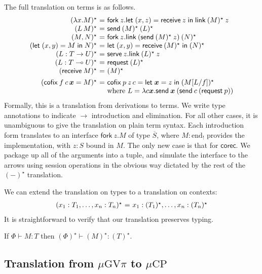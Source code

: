\documentclass[orivec,envcountsame]{llncs}
\makeatletter
\newcommand{\gvdual}[1]{\overline{#1}}
\newcommand{\lto}{\ensuremath{\multimap}}
\newcommand{\uto}{\ensuremath{\rightarrow}}
\newcommand{\outterm}{\mathrm{end}_!}
\newcommand{\gvtyp}[3]{#1 \vdash #2 : #3}
\newcommand{\mkwd}[1]{\mathsf{#1}}
\newcommand{\gvsend}[2]{\mkwd{send}\:#1\:#2}
\newcommand{\gvreceive}[1]{\mkwd{receive}\:#1}
\newcommand{\gvlet}[3]{\mkwd{let}\;#1 = #2\;\mkwd{in}\;#3}
\newcommand{\gvlink}[2]{\mkwd{link}\:#1\:#2}
\newcommand{\gvfork}[2]{\mkwd{fork}\:#1.#2}
\newcommand{\lrkwd}{\mkwd{cofix}}
\newcommand{\gvfix}[3]{\lrkwd\:#1\:#2 = #3}
\newcommand{\gvserve}[2]{\mkwd{serve}\:#1.#2}
\newcommand{\gvrequest}[1]{\mkwd{request}\:#1}
\newcommand{\key}{\mkwd}
\newcommand{\topi}[1]{({#1})^\star}
\newcommand{\mucp}{$\mu\mathrm{CP}$\xspace}
\newcommand{\gvpi}{$\mu\mathrm{GV}\pi$\xspace}
\newcommand{\ba}{\begin{array}}
\newcommand{\ea}{\end{array}}
\newenvironment{equations}{\[\ba{@{}r@{~}c@{~}l@{}}}{\ea\]}
\makeatother
\begin{document}
The full translation on terms is as follows.
\begin{equations}
\topi{\lambda x.M} &=& \gvfork{z}{\gvlet{(x, z)}{\gvreceive{z}}{\gvlink{\topi{M}}{z}}} \\
\topi{L\,M} &=& \gvsend{\topi{M}}{\topi{L}} \\
\topi{M, N} &=&
  \gvfork{z}
    {\gvlink{(\gvsend{\topi{M}}{z})}{\topi{N}}} \\
\topi{\gvlet{(x, y)}{M}{N}} &=&
    \gvlet{(x, y)}{\gvreceive{\topi{M}}}{\topi{N}} \\
\topi{L : T \uto U} &=&
  \gvserve{z}{\gvlink{\topi{L}}{z}} \\
\topi{L : T \lto U} &=& \gvrequest{\topi{L}} \\
\topi{\gvreceive{M}} &=& \topi{M}
\\[1ex]
\topi{\gvfix{f}{c\,\vec{x}}{M}} &=&
  \gvfix{p}{z\,c}{\gvlet{\vec{x}}{z}{\topi{M[L/f]}}} \\
&& \text{where }L = \lambda c \vec{x}.\gvsend{\vec{x}}{(\gvsend{c}{(\gvrequest{p})})} \\
\end{equations}%
Formally, this is a translation from derivations to terms. We write type annotations to indicate
$\to$ introduction and elimination. For all other cases, it is unambiguous to give the translation
on plain term syntax. Each introduction form translates to an interface $\gvfork{z}{M}$ of type
$\gvdual{S}$, where $M : \outterm$ provides the implementation, with $z : S$ bound in $M$.
%
The only new case is that for $\key{corec}$. We package up all of the arguments into a tuple, and
simulate the interface to the arrows using session operations in the obvious way dictated by the
rest of the $\topi{-}$ translation.

We can extend the translation on types to a translation on contexts:
\begin{equations}
\topi{x_1:T_1, \dots, x_n:T_n} &=& x_1:\topi{T_1}, \dots, x_n:\topi{T_n} \\
\end{equations}%
It is straightforward to verify that our translation preserves typing.
\begin{theorem}
If $\gvtyp{\Phi}{M}{T}$ then $\gvtyp{\topi{\Phi}}{\topi{M}}{\topi{T}}$.
\end{theorem}

\subsection{Translation from \gvpi to \mucp}\label{sec:gvpitocp}
\end{document}
